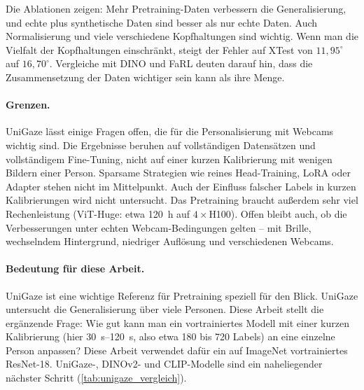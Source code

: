 Die Ablationen zeigen: Mehr Pretraining-Daten verbessern die
Generalisierung, und echte plus synthetische Daten sind besser als nur echte
Daten. Auch Normalisierung und viele verschiedene Kopfhaltungen sind wichtig.
Wenn man die Vielfalt der Kopfhaltungen einschränkt, steigt der Fehler auf
XTest von $11,95^\circ$ auf $16,70^\circ$. Vergleiche mit DINO und FaRL deuten
darauf hin, dass die Zusammensetzung der Daten wichtiger sein kann als ihre
Menge.

\paragraph{Grenzen.}
UniGaze lässt einige Fragen offen, die für die Personalisierung mit Webcams
wichtig sind. Die Ergebnisse beruhen auf vollständigen Datensätzen und
vollständigem Fine-Tuning, nicht auf einer kurzen Kalibrierung mit wenigen
Bildern einer Person. Sparsame Strategien wie reines Head-Training, LoRA oder
Adapter stehen nicht im Mittelpunkt. Auch der Einfluss falscher Labels in
kurzen Kalibrierungen wird nicht untersucht. Das Pretraining braucht außerdem
sehr viel Rechenleistung (ViT-Huge: etwa \SI{120}{\hour} auf $4\times$H100).
Offen bleibt auch, ob die Verbesserungen unter echten Webcam-Bedingungen gelten
-- mit Brille, wechselndem Hintergrund, niedriger Auflösung und verschiedenen
Webcams.

\paragraph{Bedeutung für diese Arbeit.}
UniGaze ist eine wichtige Referenz für Pretraining speziell für den Blick.
UniGaze untersucht die Generalisierung über viele Personen. Diese Arbeit stellt
die ergänzende Frage: Wie gut kann man ein vortrainiertes Modell mit einer
kurzen Kalibrierung (hier \SIrange{30}{120}{\second}, also etwa 180 bis 720
Labels) an eine einzelne Person anpassen? Diese Arbeit verwendet dafür ein auf
ImageNet vortrainiertes ResNet-18. UniGaze-, DINOv2- und CLIP-Modelle sind ein
naheliegender nächster Schritt (\cref{tab:unigaze_vergleich}).

